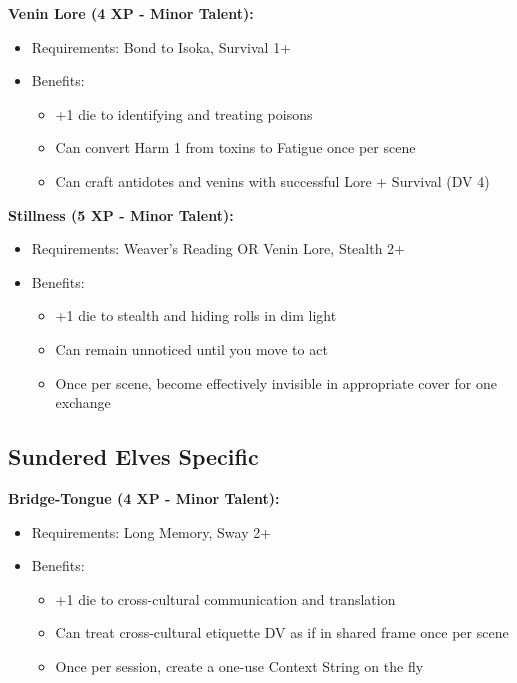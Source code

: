 \documentclass[11pt]{article}
\newcommand{\talent}[1]{\textbf{#1}}
\begin{document}
\talent{Venin Lore (4 XP - Minor Talent):}
\begin{itemize}
  \item Requirements: Bond to Isoka, Survival 1+
  \item Benefits:
    \begin{itemize}
      \item +1 die to identifying and treating poisons
      \item Can convert Harm 1 from toxins to Fatigue once per scene
      \item Can craft antidotes and venins with successful Lore + Survival (DV 4)
    \end{itemize}
\end{itemize}

\talent{Stillness (5 XP - Minor Talent):}
\begin{itemize}
  \item Requirements: Weaver's Reading OR Venin Lore, Stealth 2+
  \item Benefits:
    \begin{itemize}
      \item +1 die to stealth and hiding rolls in dim light
      \item Can remain unnoticed until you move to act
      \item Once per scene, become effectively invisible in appropriate cover for one exchange
    \end{itemize}
\end{itemize}

\subsection*{Sundered Elves Specific}
\talent{Bridge-Tongue (4 XP - Minor Talent):}
\begin{itemize}
  \item Requirements: Long Memory, Sway 2+
  \item Benefits:
    \begin{itemize}
      \item +1 die to cross-cultural communication and translation
      \item Can treat cross-cultural etiquette DV as if in shared frame once per scene
      \item Once per session, create a one-use Context String on the fly
    \end{itemize}
\end{itemize}
\end{document}
